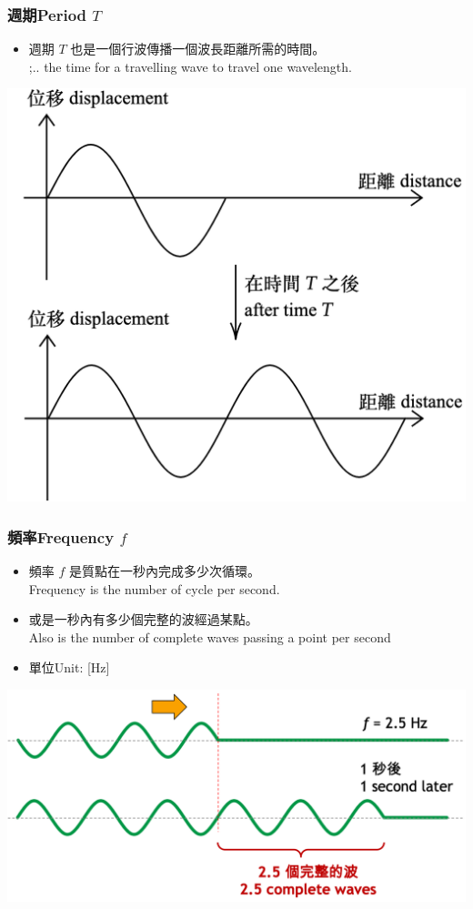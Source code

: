 \documentclass[beamer=true]{standalone}
\begin{document}
\begin{frame}
    \frametitle{週期Period $T$}

    \begin{itemize}
        \item 週期 $T$ 也是一個行波傳播一個波長距離所需的時間。\\;.. the time for a travelling wave to travel one wavelength.
    \end{itemize}
    \par{\par\centering\includegraphics[width=.6\textwidth]{./img/ch1_2024-05-07-18-16-42.png}\par}
\end{frame}

\begin{frame}
    \frametitle{頻率Frequency $f$}
    \begin{itemize}
        \item 頻率 $f$ 是質點在一秒內完成多少次循環。\\Frequency is the number of cycle per second.
        \item 或是一秒內有多少個完整的波經過某點。\\Also is the number of complete waves passing a point per second
        \item 單位Unit: [Hz]
    \end{itemize}
    \par{\par\centering\includegraphics[width=.75\textwidth]{./img/ch1_2024-05-08-15-21-40.png}\par}
\end{frame}
\end{document}
